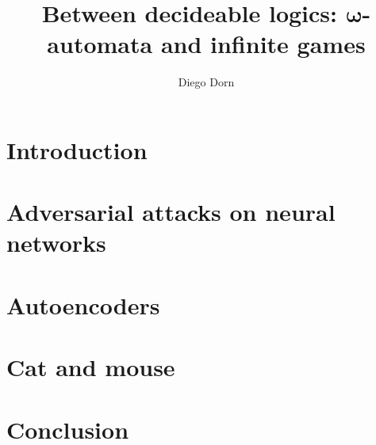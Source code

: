 \documentclass[]{scrarticle}
\title{Between decideable logics: $\mathbf{\omega}$-automata and infinite games}
\author{Diego Dorn}
\begin{document}


\newpage


\section*{Introduction}

\tableofcontents



\clearpage
\section{Adversarial attacks on neural networks}
\section{Autoencoders}
\section{Cat and mouse}

\section*{Conclusion}


\newpage
\nocite{*}


\end{document}
